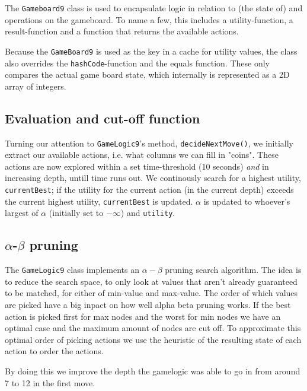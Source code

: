 The \texttt{Gameboard9} class is used to encapsulate logic in relation to (the state of) and operations on the gameboard. To name a few, this includes a utility-function, a result-function and a function that returns the available actions.

Because the \texttt{GameBoard9} is used as the key in a cache for utility values, the class also overrides the \texttt{hashCode}-function and the equals function. These only compares the actual game board state, which internally is represented as a 2D array of integers.

\subsection{Evaluation and cut-off function}

Turning our attention to \texttt{GameLogic9}'s method, \texttt{decideNextMove()}, we initially extract our available actions, i.e. what columns we can fill in "coins". These actions are now explored within a set time-threshold (10 seconds) \textit{and} in increasing depth, untill time runs out. We continously search for a highest utility, \texttt{currentBest}; if the utility for the current action (in the current depth) exceeds the current highest utility, \texttt{currentBest} is updated. $\alpha$ is updated to whoever's largest of $\alpha$ (initially set to $-\infty$) and \texttt{utility}.




\subsection{$\alpha$-$\beta$ pruning}
The \texttt{GameLogic9} class implements an $\alpha-\beta$ pruning search algorithm. The idea is to reduce the search space, to only look at values that aren't already guaranteed to be matched, for either of min-value and max-value. The order of which values are picked have a big inpact on how well alpha beta pruning works. If the best action is picked first for max nodes and the worst for min nodes we have an optimal case and the maximum amount of nodes are cut off. To approximate this optimal order of picking actions we use the heuristic of the resulting state of each action to order the actions. 

By doing this we improve the depth the gamelogic was able to go in from around 7 to 12 in the first move.